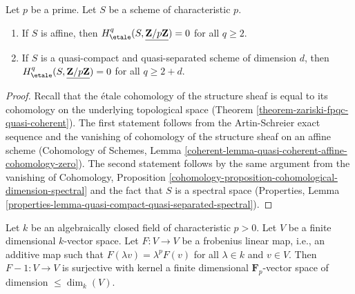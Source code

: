 \begin{lemma}
\label{lemma-vanishing-affine-char-p-p}
Let $p$ be a prime. Let $S$ be a scheme of characteristic $p$.
\begin{enumerate}
\item If $S$ is affine, then
$H_\etale^q(S, \underline{\mathbf{Z}/p\mathbf{Z}}) = 0$ for all
$q \geq 2$.
\item If $S$ is a quasi-compact and quasi-separated scheme of
dimension $d$, then $H_\etale^q(S, \underline{\mathbf{Z}/p\mathbf{Z}}) = 0$
for all $q \geq 2 + d$.
\end{enumerate}
\end{lemma}

\begin{proof}
Recall that the \'etale cohomology of the structure sheaf is equal
to its cohomology on the underlying topological space
(Theorem \ref{theorem-zariski-fpqc-quasi-coherent}).
The first statement follows from the Artin-Schreier exact sequence
and the vanishing of cohomology of the structure sheaf on an affine
scheme (Cohomology of Schemes, Lemma
\ref{coherent-lemma-quasi-coherent-affine-cohomology-zero}).
The second statement follows by the same argument from
the vanishing of Cohomology, Proposition
\ref{cohomology-proposition-cohomological-dimension-spectral}
and the fact that $S$ is a spectral space
(Properties, Lemma
\ref{properties-lemma-quasi-compact-quasi-separated-spectral}).
\end{proof}

\begin{lemma}
\label{lemma-F-1}
Let $k$ be an algebraically closed field of characteristic $p > 0$.
Let $V$ be a finite dimensional $k$-vector space. Let $F : V \to V$
be a frobenius linear map, i.e., an additive map such that
$F(\lambda v) = \lambda^p F(v)$ for all $\lambda \in k$ and $v \in V$.
Then $F - 1 : V \to V$ is surjective with kernel a finite dimensional
$\mathbf{F}_p$-vector space of dimension $\leq \dim_k(V)$.
\end{lemma}

